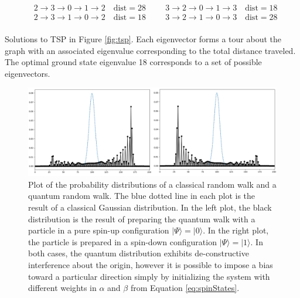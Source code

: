 \begin{table}[h]
\[\begin{split}
			&2 \rightarrow 3 \rightarrow 0 \rightarrow 1 \rightarrow 2 \quad \text{dist}=28 \hspace{1cm} 3 \rightarrow 2 \rightarrow 0 \rightarrow 1 \rightarrow 3 \quad \text{dist}=18\\
			&2 \rightarrow 3 \rightarrow 1 \rightarrow 0 \rightarrow 2 \quad \text{dist}=18 \hspace{1cm} 3 \rightarrow 2 \rightarrow 1 \rightarrow 0 \rightarrow 3 \quad \text{dist}=28\\
		\end{split}
		\]
		\caption{\doublespacing Solutions to TSP in Figure \ref{fig:tsp}. 
			Each eigenvector forms a tour about the graph with an associated eigenvalue corresponding to the total distance traveled. 
			The optimal ground state eigenvalue 18 corresponds to a set of possible eigenvectors.}
		\label{tab:eigenset}
	\end{table}
		\begin{figure}[h]
			\begin{center}
				\includegraphics[width=16cm]{images/bias}
			\end{center}
			\caption{\doublespacing Plot of the probability distributions of a classical random walk and a quantum random walk. 
				The blue dotted line in each plot is the result of a classical Gaussian distribution. 
				In the left plot, the black distribution is the result of preparing the quantum walk with a particle in a pure spin-up configuration $|\Psi\rangle = |0\rangle$. 
				In the right plot, the particle is prepared in a spin-down configuration $|\Psi\rangle = |1\rangle$. 
				In both cases, the quantum distribution exhibits de-constructive interference about the origin, however it is possible to impose a bias toward a particular direction simply by initializing the system with different weights in $\alpha$ and $\beta$ from Equation \ref{eq:spinStates}.}
			\label{fig:biasWalk}
		\end{figure}

